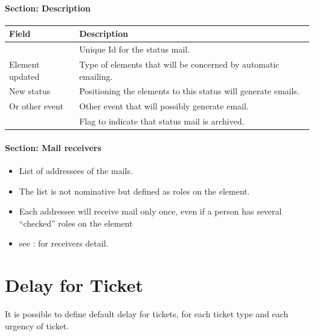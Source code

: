 \documentclass[letterpaper,10pt,english]{sphinxmanual}
\begin{document}
\paragraph{Section: Description}

\begin{tabulary}{\linewidth}{|l|l|}
\hline
\textsf{\relax 
Field
} & \textsf{\relax 
Description
}\\
\hline
{\hyperref[Glossary:term-id]{\emph{}}}
 & 
Unique Id for the status mail.
\\
\hline
Element updated
 & 
Type of elements that will be concerned by automatic emailing.
\\
\hline
New status
 & 
Positioning the elements to this status will generate emails.
\\
\hline
Or other event
 & 
Other event that will possibly generate email.
\\
\hline
{\hyperref[Glossary:term-closed]{\emph{}}}
 & 
Flag to indicate that status mail is archived.
\\
\hline\end{tabulary}

\paragraph{Section: Mail receivers}
\begin{itemize}
\item {} 
List of addressees of the mails.

\item {} 
The list is not nominative but defined as roles on the element.

\item {} 
Each addressee will receive mail only once, even if a person has several “checked” roles on the element

\item {} 
see : {\hyperref[ControlAutomation:ctrlauto-msg-receivers]{\emph{}}} for receivers detail.

\end{itemize}
\newpage
{}

\section{Delay for Ticket}
\label{ControlAutomation:delay-for-ticket}\label{ControlAutomation:index-2}
It is possible to define default delay for tickets, for each ticket type and each urgency of ticket.
\end{document}
